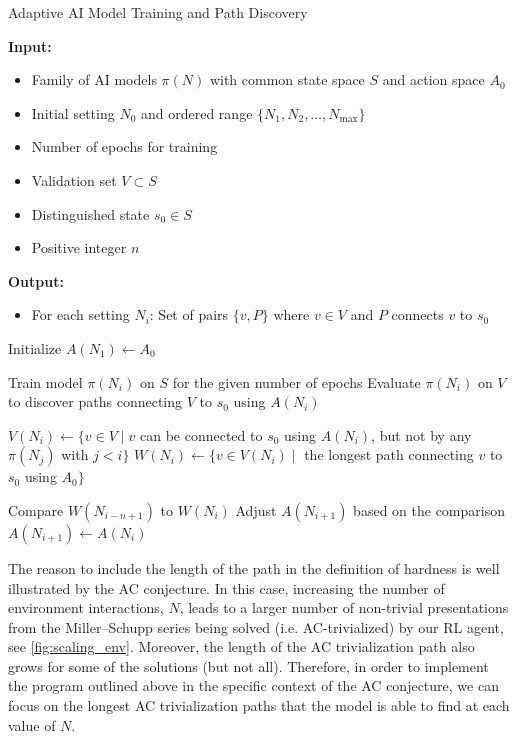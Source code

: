 \begin{algorithm}
	\caption{Adaptive AI Model Training and Path Discovery}
	\label{alg:adaptive_ai_model}
	\begin{algorithmic}[1]
		\State \textbf{Input:}
		\begin{itemize}
			\item[] Family of AI models $\pi(N)$ with common state space $S$ and action space $A_0$
			\item[] Initial setting $N_0$ and ordered range $\{N_1, N_2, \ldots, N_{\text{max}}\}$
			\item[] Number of epochs for training
			\item[] Validation set $V \subset S$
			\item[] Distinguished state $s_0 \in S$
			\item[] Positive integer $n$
		\end{itemize}

		\State \textbf{Output:}
		\begin{itemize}
			\item[] For each setting $N_i$: Set of pairs $\{v, P\}$ where $v \in V$ and $P$ connects $v$ to $s_0$
		\end{itemize}

		\State Initialize $A(N_1) \gets A_0$

		\State Train model $\pi(N_i)$ on $S$ for the given number of epochs
		\State Evaluate $\pi(N_i)$ on $V$ to discover paths connecting $V$ to $s_0$ using $A(N_i)$

		\State $V(N_i) \gets \{ v \in V \mid v$ can be connected to $s_0$ using $A(N_i)$, but not by any $\pi(N_j)$ with $j < i\}$
		\State $W(N_i) \gets \{ v \in V(N_i) \mid$ the longest path connecting $v$ to $s_0$ using $A_0 \}$

		\State Compare $W(N_{i-n+1})$ to $W(N_i)$
		\State Adjust $A(N_{i+1})$ based on the comparison
		\Else
		\State $A(N_{i+1}) \gets A(N_i)$
		\EndIf
		\EndFor
	\end{algorithmic}
\end{algorithm}

The reason to include the length of the path in the definition of hardness is well illustrated by the AC conjecture. In this case, increasing the number of environment interactions, $N$, leads to a larger number of non-trivial presentations from the Miller--Schupp series being solved (i.e. AC-trivialized) by our RL agent, see \cref{fig:scaling_env}. Moreover, the length of the AC trivialization path also grows for some of the solutions (but not all). Therefore, in order to implement the program outlined above in the specific context of the AC conjecture, we can focus on the longest AC trivialization paths that the model is able to find at each value of $N$.


